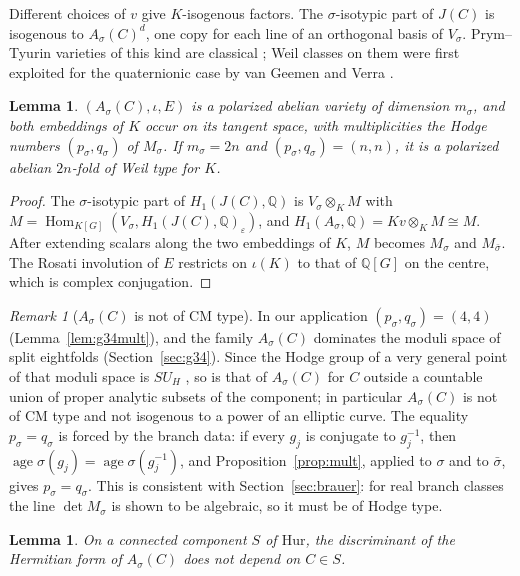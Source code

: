\documentclass[11pt]{amsart}
\newtheorem{lemma}[theorem]{Lemma}
\theoremstyle{definition}
\theoremstyle{remark}
\newtheorem{remark}[theorem]{Remark}
\newcommand{\Q}{\mathbb Q}
\newcommand{\Hom}{\operatorname{Hom}}
\newcommand{\age}{\operatorname{age}}
\newcommand{\cH}{\mathrm{Hur}}
\begin{document}
Different choices of $v$ give $K$-isogenous factors. The $\sigma$-isotypic part of $J(C)$ is isogenous to $A_\sigma(C)^d$, one copy for each line of an orthogonal basis of $V_\sigma$. Prym--Tyurin varieties of this kind are classical \cite[Ch.~12]{BL}; Weil classes on them were first exploited for the quaternionic case by van Geemen and Verra \cite{vGV}.

\begin{lemma}\label{lem:weiltype}
$(A_\sigma(C),\iota,E)$ is a polarized abelian variety of dimension $m_\sigma$, and both embeddings of $K$ occur on its tangent space, with multiplicities the Hodge numbers $(p_\sigma,q_\sigma)$ of $M_\sigma$. If $m_\sigma=2n$ and $(p_\sigma,q_\sigma)=(n,n)$, it is a polarized abelian $2n$-fold of Weil type for $K$.
\end{lemma}

\begin{proof}
The $\sigma$-isotypic part of $H_1(J(C),\Q)$ is $V_\sigma\otimes_KM$ with $M=\Hom_{K[G]}(V_\sigma,H_1(J(C),\Q)_\varepsilon)$, and $H_1(A_\sigma,\Q)=Kv\otimes_KM\cong M$. After extending scalars along the two embeddings of $K$, $M$ becomes $M_\sigma$ and $M_{\bar\sigma}$. The Rosati involution of $E$ restricts on $\iota(K)$ to that of $\Q[G]$ on the centre, which is complex conjugation.
\end{proof}

\begin{remark}[$A_\sigma(C)$ is not of CM type]\label{rem:reflection}
In our application $(p_\sigma,q_\sigma)=(4,4)$ (Lemma~\ref{lem:g34mult}), and the family $A_\sigma(C)$ dominates the moduli space of split eightfolds (Section~\ref{sec:g34}). Since the Hodge group of a very general point of that moduli space is $SU_H$ \cite[Theorem~6.11]{vanGeemen}, so is that of $A_\sigma(C)$ for $C$ outside a countable union of proper analytic subsets of the component; in particular $A_\sigma(C)$ is not of CM type and not isogenous to a power of an elliptic curve. The equality $p_\sigma=q_\sigma$ is forced by the branch data: if every $g_j$ is conjugate to $g_j^{-1}$, then $\age\sigma(g_j)=\age\sigma(g_j^{-1})$, and Proposition~\ref{prop:mult}, applied to $\sigma$ and to $\bar\sigma$, gives $p_\sigma=q_\sigma$. This is consistent with Section~\ref{sec:brauer}: for real branch classes the line $\det M_\sigma$ is shown to be algebraic, so it must be of Hodge type.
\end{remark}

\begin{lemma}\label{lem:constancy}
On a connected component $S$ of $\cH$, the discriminant of the Hermitian form of $A_\sigma(C)$ does not depend on $C\in S$.
\end{lemma}
\end{document}
